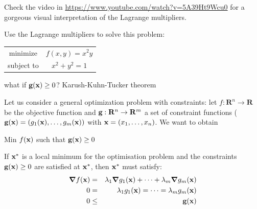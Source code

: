 \documentclass[c]{beamer}
\begin{document}
\begin{frame}
  Check the video in \url{https://www.youtube.com/watch?v=5A39Ht9Wcu0} for a gorgeous visual interpretation of the Lagrange multipliers.
\begin{Exercise}
  Use the Lagrange multipliers to solve this problem:
  \begin{center}
    \begin{tabular}{cc}
      minimize & $f(x,y)=x^2y$ \\
      subject to & $x^2+y^2=1$
    \end{tabular}
  \end{center}
\end{Exercise}
\end{frame}
\begin{frame}{what if $\textbf{g}(\textbf{x})\geq 0$? Karush-Kuhn-Tucker theorem}

  Let us consider a general optimization problem with constraints: let $f:\mathbf{R}^n \rightarrow \mathbf{R}$ be the objective function and $\textbf{g}:\mathbf{R}^n \rightarrow \mathbf{R}^m$ a set of constraint functions ($\textbf{g}(\textbf{x})=(g_1(\textbf{x}),\ldots,g_m(\textbf{x}))$ with $\textbf{x}=(x_1,\ldots,x_n)$. We want to obtain
  \begin{center}
  Min $f(\textbf{x})$ such that $\textbf{g}(\textbf{x})\geq 0$
\end{center}
  \begin{theorem}
    If $\textbf{x}^*$ is a local minimum for the optimisation problem and the constraints $\textbf{g}(\textbf{x})\geq 0$ are satisfied at $\textbf{x}^*$, then $\textbf{x}^*$ must satisfy:
    \begin{eqnarray*}
      \grad f({\textbf{x}})&=&\lambda_1 \grad g_1(\textbf{x})+\cdots+\lambda_m \grad g_m(\textbf{x})\\
      0&=&\lambda_1  g_1(\textbf{x})=\cdots=\lambda_m  g_m(\textbf{x})\\
      0&\leq&\textbf{g}(\textbf{x})
    \end{eqnarray*}
  \end{theorem}

\end{frame}
\end{document}
